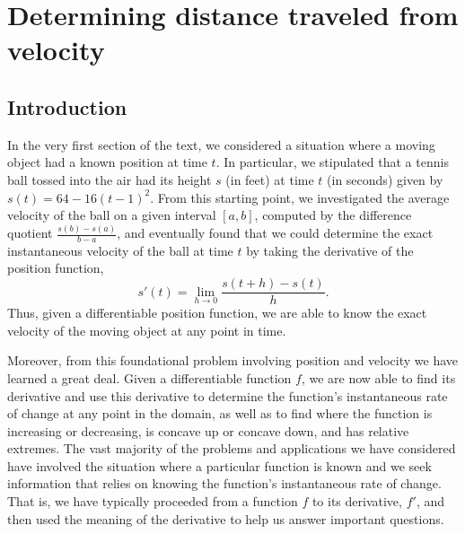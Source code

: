 \section{Determining distance traveled from velocity} \label{S:4.1.VelocityDistance}

\vspace*{-14 pt}

\subsection*{Introduction}

In the very first section of the text, we considered a situation where a moving object had a known position at time $t$.  In particular, we stipulated that a tennis ball tossed into the air had its height $s$ (in feet) at time $t$ (in seconds) given by $s(t) = 64 - 16(t-1)^2$.  From this starting point, we investigated the average velocity of the ball on a given interval $[a,b]$, computed by the difference quotient $\frac{s(b)-s(a)}{b-a}$, and eventually found that we could determine the exact instantaneous velocity of the ball at time $t$ by taking the derivative of the position function,
$$s'(t) = \lim_{h \to 0} \frac{s(t+h)-s(t)}{h}.$$
Thus, given a differentiable position function, we are able to know the exact velocity of the moving object at any point in time.

Moreover, from this foundational problem involving position and velocity we have learned a great deal.  Given a differentiable function $f$, we are now able to find its derivative and use this derivative to determine the function's instantaneous rate of change at any point in the domain, as well as to find where the function is increasing or decreasing, is concave up or concave down, and has relative extremes.  The vast majority of the problems and applications we have considered have involved the situation where a particular function is known and we seek information that relies on knowing the function's instantaneous rate of change.  That is, we have typically proceeded from a function $f$ to its derivative, $f'$, and then used the meaning of the derivative to help us answer important questions.  

